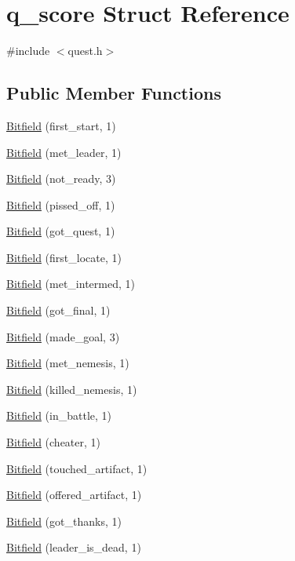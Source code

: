 \hypertarget{structq__score}{\section{q\+\_\+score Struct Reference}
\label{structq__score}
}


{\ttfamily \#include $<$quest.\+h$>$}

\subsection*{Public Member Functions}
\begin{DoxyCompactItemize}
\item 
\hyperlink{structq__score_ae110036aebfca461019b5f25b22a834b}{Bitfield} (first\+\_\+start, 1)
\item 
\hyperlink{structq__score_adbd67456938dd638e63273b68cd9c32d}{Bitfield} (met\+\_\+leader, 1)
\item 
\hyperlink{structq__score_a4d6f473a709e7e2126a9c980e42816ff}{Bitfield} (not\+\_\+ready, 3)
\item 
\hyperlink{structq__score_a04a3948421ea185c27bcf0cc5a62071f}{Bitfield} (pissed\+\_\+off, 1)
\item 
\hyperlink{structq__score_a551b0b706c45ac9707c7046ffa43ac99}{Bitfield} (got\+\_\+quest, 1)
\item 
\hyperlink{structq__score_a606f68b36965ca8e611522bdf90b0af7}{Bitfield} (first\+\_\+locate, 1)
\item 
\hyperlink{structq__score_aeecb6b9d4fc53fb20da18b95183463e2}{Bitfield} (met\+\_\+intermed, 1)
\item 
\hyperlink{structq__score_a8da2f71b9e1448947c608e7faf75a68b}{Bitfield} (got\+\_\+final, 1)
\item 
\hyperlink{structq__score_abad864b51cca0ad1b5eeddfd0b3296b7}{Bitfield} (made\+\_\+goal, 3)
\item 
\hyperlink{structq__score_af48000d25ed46ee25851b648f952b8fc}{Bitfield} (met\+\_\+nemesis, 1)
\item 
\hyperlink{structq__score_a2e76b22e390d099b6572ba890240aeba}{Bitfield} (killed\+\_\+nemesis, 1)
\item 
\hyperlink{structq__score_a7ed598d563dc0e644543eaa10b49ed5a}{Bitfield} (in\+\_\+battle, 1)
\item 
\hyperlink{structq__score_abcdccb8eaa0fba41229a2e4a77df669e}{Bitfield} (cheater, 1)
\item 
\hyperlink{structq__score_af1803bcbdc48cd49103c28a94159126d}{Bitfield} (touched\+\_\+artifact, 1)
\item 
\hyperlink{structq__score_afca8492fa5fa0241355c2563f33cd87b}{Bitfield} (offered\+\_\+artifact, 1)
\item 
\hyperlink{structq__score_ad08c3cbb63df483697526ce558ea2cd1}{Bitfield} (got\+\_\+thanks, 1)
\item 
\hyperlink{structq__score_a047f3733580673291c49d4220a3595ec}{Bitfield} (leader\+\_\+is\+\_\+dead, 1)
\end{DoxyCompactItemize}
